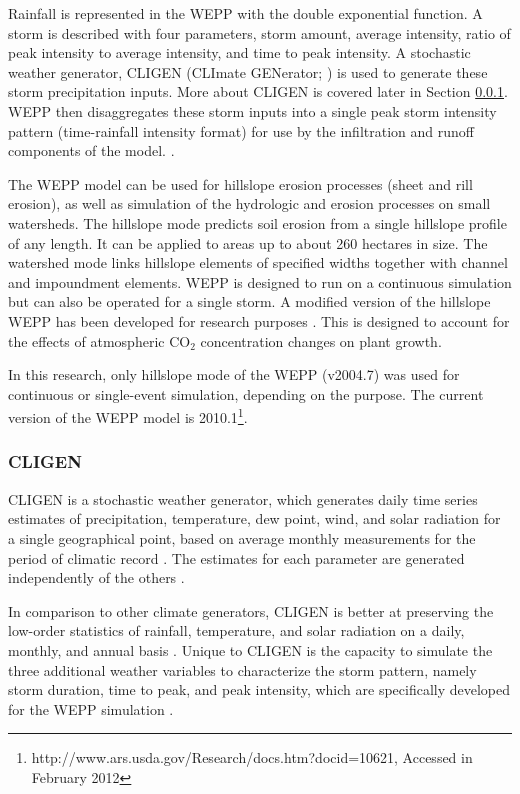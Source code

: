 Rainfall is represented in the WEPP with the double exponential function. A
storm is described with four parameters, storm amount, average intensity, ratio
of peak intensity to average intensity, and time to peak intensity. A stochastic
weather generator, CLIGEN (CLImate GENerator; \citealp{nicks1995-2}) is used to
generate these storm precipitation inputs. More about CLIGEN is covered later in
Section \ref{sec:ClimateGeneratorCLIGEN}. WEPP then disaggregates these storm
inputs into a single peak storm intensity pattern (time-rainfall intensity
format) for use by the infiltration and runoff components of the model.
\citep{flanagan1995-usda}.

The WEPP model can be used for hillslope erosion processes (sheet and rill
erosion), as well as simulation of the hydrologic and erosion processes on small
watersheds. The hillslope mode predicts soil erosion from a single hillslope
profile of any length. It can be applied to areas up to about 260 hectares in
size. The watershed mode links hillslope elements of specified widths together
with channel and impoundment elements. WEPP is designed to run on a continuous
simulation but can also be operated for a single storm. A modified version of
the hillslope WEPP has been developed for research purposes
\citep{favis-mortlock1999-329,favis-mortlock1996-529}. This is designed to
account for the effects of atmospheric CO$_2$ concentration changes on plant
growth.

In this research, only hillslope mode of the WEPP (v2004.7) was used for
continuous or single-event simulation, depending on the purpose. The current
version of the WEPP model is
2010.1\footnote{http://www.ars.usda.gov/Research/docs.htm?docid=10621, Accessed
in February 2012}.

\subsubsection{CLIGEN}
\label{sec:ClimateGeneratorCLIGEN}
CLIGEN is a stochastic weather generator, which generates daily time series
estimates of precipitation, temperature, dew point, wind, and solar radiation
for a single geographical point, based on average monthly measurements for the
period of climatic record \citep{nicks1995-2}. The estimates for each parameter
are generated independently of the others \citep{nicks1995-2}.

In comparison to other climate generators, CLIGEN is better at preserving the
low-order statistics of rainfall, temperature, and solar radiation on a daily,
monthly, and annual basis \citep{nicks1995-2}. Unique to CLIGEN is the capacity
to simulate the three additional weather variables to characterize the storm
pattern, namely storm duration, time to peak, and peak intensity, which are
specifically developed for the WEPP simulation \citep{flanagan1995-usda}.

